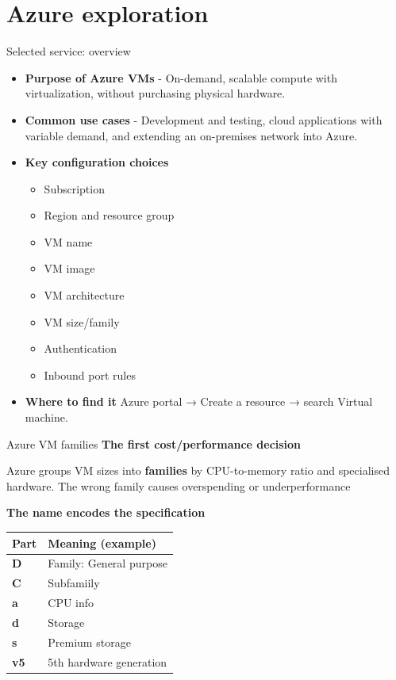 \documentclass[aspectratio=169,xcolor=dvipsnames]{beamer}
\begin{document}
\section{Azure exploration}
\begin{frame}{Selected service: overview}
\begin{itemize}
\item \textbf{Purpose of Azure VMs} - On-demand, scalable compute with virtualization, without purchasing physical hardware.
\item \textbf{Common use cases} - Development and testing, cloud applications with variable demand, and extending an on-premises network into Azure.
\item \textbf{Key configuration choices}
 \begin{itemize}
 	\item Subscription
 	\item Region and resource group
 	\item VM name
 	\item VM image
 	\item VM architecture
 	\item VM size/family
 	\item Authentication
 	\item Inbound port rules
 \end{itemize}
 \item \textbf{Where to find it} Azure portal → Create a resource → search Virtual machine.
\end{itemize}
\end{frame}
\begin{frame}{Azure VM families}
	\textbf{The first cost/performance decision}
	
	\vspace{0.2cm}
	Azure groups VM sizes into \textbf{families} by CPU-to-memory ratio and
	specialised hardware. The wrong family causes overspending
	or underperformance
	
	\vspace{0.3cm}
	\textbf{The name encodes the specification}
	
	\vspace{0.1cm}
	{\footnotesize
		\begin{center}
			\begin{tabular}{@{}ll@{}}
				\toprule
				\textbf{Part} & \textbf{Meaning (example)} \\
				\midrule
				\textbf{D}  & Family: General purpose \\
				\textbf{C}  & Subfamiily \\
				\textbf{a}  & CPU info \\
				\textbf{d}  & Storage \\
				\textbf{s}  & Premium storage \\
				\textbf{v5} & 5th hardware generation \\
				\bottomrule
			\end{tabular}
		\end{center}
	}
\end{frame}
\end{document}
